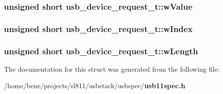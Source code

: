 \subsubsection{\setlength{\rightskip}{0pt plus 5cm}unsigned short {\bf usb\_\-device\_\-request\_\-t::w\-Value}}\label{structusb__device__request__t_dfc97a726a3e4d25f16e6c9027d1cd58}


\subsubsection{\setlength{\rightskip}{0pt plus 5cm}unsigned short {\bf usb\_\-device\_\-request\_\-t::w\-Index}}\label{structusb__device__request__t_762118ac9ad16c32a142bed0956c7f92}


\subsubsection{\setlength{\rightskip}{0pt plus 5cm}unsigned short {\bf usb\_\-device\_\-request\_\-t::w\-Length}}\label{structusb__device__request__t_95dca1e757c027ca4c5c6022f7192d49}




The documentation for this struct was generated from the following file:\begin{CompactItemize}
\item 
/home/bene/projects/sl811/usbstack/usbspec/{\bf usb11spec.h}\end{CompactItemize}

